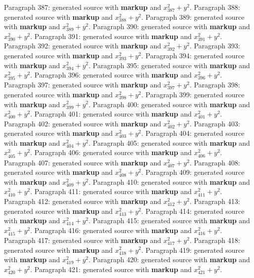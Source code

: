 \documentclass{article}
\begin{document}
Paragraph 387: generated source with \textbf{markup} and $x_{387}^2 + y^2$.
Paragraph 388: generated source with \textbf{markup} and $x_{388}^2 + y^2$.
Paragraph 389: generated source with \textbf{markup} and $x_{389}^2 + y^2$.
Paragraph 390: generated source with \textbf{markup} and $x_{390}^2 + y^2$.
Paragraph 391: generated source with \textbf{markup} and $x_{391}^2 + y^2$.
Paragraph 392: generated source with \textbf{markup} and $x_{392}^2 + y^2$.
Paragraph 393: generated source with \textbf{markup} and $x_{393}^2 + y^2$.
Paragraph 394: generated source with \textbf{markup} and $x_{394}^2 + y^2$.
Paragraph 395: generated source with \textbf{markup} and $x_{395}^2 + y^2$.
Paragraph 396: generated source with \textbf{markup} and $x_{396}^2 + y^2$.
Paragraph 397: generated source with \textbf{markup} and $x_{397}^2 + y^2$.
Paragraph 398: generated source with \textbf{markup} and $x_{398}^2 + y^2$.
Paragraph 399: generated source with \textbf{markup} and $x_{399}^2 + y^2$.
Paragraph 400: generated source with \textbf{markup} and $x_{400}^2 + y^2$.
Paragraph 401: generated source with \textbf{markup} and $x_{401}^2 + y^2$.
Paragraph 402: generated source with \textbf{markup} and $x_{402}^2 + y^2$.
Paragraph 403: generated source with \textbf{markup} and $x_{403}^2 + y^2$.
Paragraph 404: generated source with \textbf{markup} and $x_{404}^2 + y^2$.
Paragraph 405: generated source with \textbf{markup} and $x_{405}^2 + y^2$.
Paragraph 406: generated source with \textbf{markup} and $x_{406}^2 + y^2$.
Paragraph 407: generated source with \textbf{markup} and $x_{407}^2 + y^2$.
Paragraph 408: generated source with \textbf{markup} and $x_{408}^2 + y^2$.
Paragraph 409: generated source with \textbf{markup} and $x_{409}^2 + y^2$.
Paragraph 410: generated source with \textbf{markup} and $x_{410}^2 + y^2$.
Paragraph 411: generated source with \textbf{markup} and $x_{411}^2 + y^2$.
Paragraph 412: generated source with \textbf{markup} and $x_{412}^2 + y^2$.
Paragraph 413: generated source with \textbf{markup} and $x_{413}^2 + y^2$.
Paragraph 414: generated source with \textbf{markup} and $x_{414}^2 + y^2$.
Paragraph 415: generated source with \textbf{markup} and $x_{415}^2 + y^2$.
Paragraph 416: generated source with \textbf{markup} and $x_{416}^2 + y^2$.
Paragraph 417: generated source with \textbf{markup} and $x_{417}^2 + y^2$.
Paragraph 418: generated source with \textbf{markup} and $x_{418}^2 + y^2$.
Paragraph 419: generated source with \textbf{markup} and $x_{419}^2 + y^2$.
Paragraph 420: generated source with \textbf{markup} and $x_{420}^2 + y^2$.
Paragraph 421: generated source with \textbf{markup} and $x_{421}^2 + y^2$.
\end{document}
